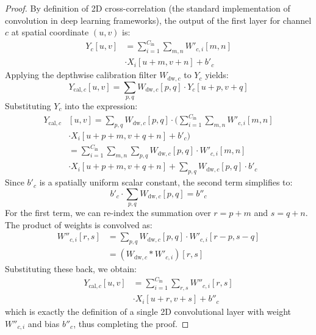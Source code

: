 \documentclass{article}
\theoremstyle{plain}
\theoremstyle{definition}
\theoremstyle{remark}
\begin{document}
\begin{proof}
By definition of 2D cross-correlation (the standard implementation of convolution in deep learning frameworks), the output of the first layer for channel $c$ at spatial coordinate $(u, v)$ is:
\begin{align*}
    Y_c[u, v] &= \sum_{i=1}^{C_{\text{in}}} \sum_{m, n} W'_{c, i}[m, n] \\
    &\cdot X_i[u+m, v+n] + b'_c
\end{align*}
Applying the depthwise calibration filter $W_{\text{dw}, c}$ to $Y_c$ yields:
\begin{equation}
    Y_{\text{cal}, c}[u, v] = \sum_{p, q} W_{\text{dw}, c}[p, q] \cdot Y_c[u+p, v+q]
\end{equation}
Substituting $Y_c$ into the expression:
\begin{align*}
    Y_{\text{cal}, c}&[u, v] = \sum_{p, q} W_{\text{dw}, c}[p, q] \cdot \Bigg( \sum_{i=1}^{C_{\text{in}}} \sum_{m, n} W'_{c, i}[m, n] \\
    &\cdot X_i[u+p+m, v+q+n] + b'_c \Bigg) \\
    &= \sum_{i=1}^{C_{\text{in}}} \sum_{m, n} \sum_{p, q} W_{\text{dw}, c}[p, q] \cdot W'_{c, i}[m, n] \\
    &\cdot X_i[u+p+m, v+q+n] + \sum_{p, q} W_{\text{dw}, c}[p, q] \cdot b'_c
\end{align*}
Since $b'_c$ is a spatially uniform scalar constant, the second term simplifies to:
\begin{equation}
    b'_c \cdot \sum_{p, q} W_{\text{dw}, c}[p, q] = b''_c
\end{equation}
For the first term, we can re-index the summation over $r = p + m$ and $s = q + n$. The product of weights is convolved as:
\begin{align*}
    W''_{c, i}[r, s] &= \sum_{p, q} W_{\text{dw}, c}[p, q] \cdot W'_{c, i}[r-p, s-q] \\
    &= (W_{\text{dw}, c} * W'_{c, i})[r, s]
\end{align*}
Substituting these back, we obtain:
\begin{align*}
    Y_{\text{cal}, c}[u, v] &= \sum_{i=1}^{C_{\text{in}}} \sum_{r, s} W''_{c, i}[r, s] \\
    &\cdot X_i[u+r, v+s] + b''_c
\end{align*}
which is exactly the definition of a single 2D convolutional layer with weight $W''_{c, i}$ and bias $b''_c$, thus completing the proof.
\end{proof}
\end{document}
